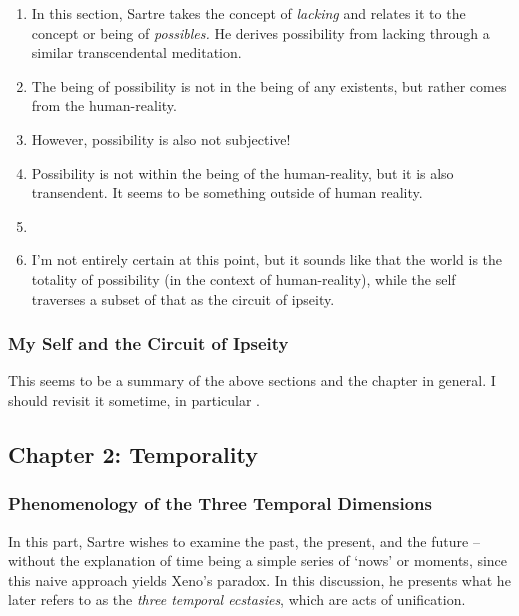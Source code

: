 \begin{enumerate}
  \item In this section, Sartre takes the concept of \emph{lacking} and relates it to the concept or being of \emph{possibles.} He derives possibility from lacking through a similar transcendental meditation.
  \item The being of possibility is not in the being of any existents, but rather comes from the human-reality.
  \item However, possibility is also not subjective!
  \item Possibility is not within the being of the human-reality, but it is also transendent. It seems to be something outside of human reality. \autocite[158]{sartre}
  \item {}
  \item I'm not entirely certain at this point, but it sounds like that the world is the totality of possibility (in the context of human-reality), while the self traverses a subset of that as the circuit of ipseity.
\end{enumerate}

\subsubsection{My Self and the Circuit of Ipseity}

This seems to be a summary of the above sections and the chapter in general. I should revisit it sometime, in particular \autocite[161]{sartre}.

\subsection{Chapter 2: Temporality}

\subsubsection{Phenomenology of the Three Temporal Dimensions}

In this part, Sartre wishes to examine the past, the present, and the future -- without the explanation of time being a simple series of `nows' or moments, since this naive approach yields Xeno's paradox. In this discussion, he presents what he later refers to as the \emph{three temporal ecstasies}, which are acts of unification. 

